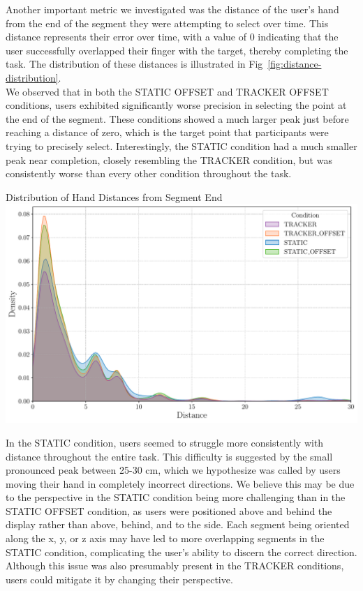 Another important metric we investigated was the distance of the user's hand from the end of the segment they were attempting to select over time. This distance represents their error over time, with a value of 0 indicating that the user successfully overlapped their finger with the target, thereby completing the task. The distribution of these distances is illustrated in Fig~\ref{fig:distance-distribution}. \\

We observed that in both the STATIC OFFSET and TRACKER OFFSET conditions, users exhibited significantly worse precision in selecting the point at the end of the segment. These conditions showed a much larger peak just before reaching a distance of zero, which is the target point that participants were trying to precisely select. Interestingly, the STATIC condition had a much smaller peak near completion, closely resembling the TRACKER condition, but was consistently worse than every other condition throughout the task. \\

\begin{figureBox}[label={fig:distance-distribution}, width=0.8\linewidth]{Distribution of Hand Distances from Segment End}
    \includegraphics[width = 1.0\linewidth]{./evaluation/figures/survery/distance-distribution.pdf}
\end{figureBox}

In the STATIC condition, users seemed to struggle more consistently with distance throughout the entire task. This difficulty is suggested by the small pronounced peak between 25-30 cm, which we hypothesize was called by users moving their hand in completely incorrect directions. We believe this may be due to the perspective in the STATIC condition being more challenging than in the STATIC OFFSET condition, as users were positioned above and behind the display rather than above, behind, and to the side. Each segment being oriented along the x, y, or z axis may have led to more overlapping segments in the STATIC condition, complicating the user's ability to discern the correct direction. Although this issue was also presumably present in the TRACKER conditions, users could mitigate it by changing their perspective. \\


